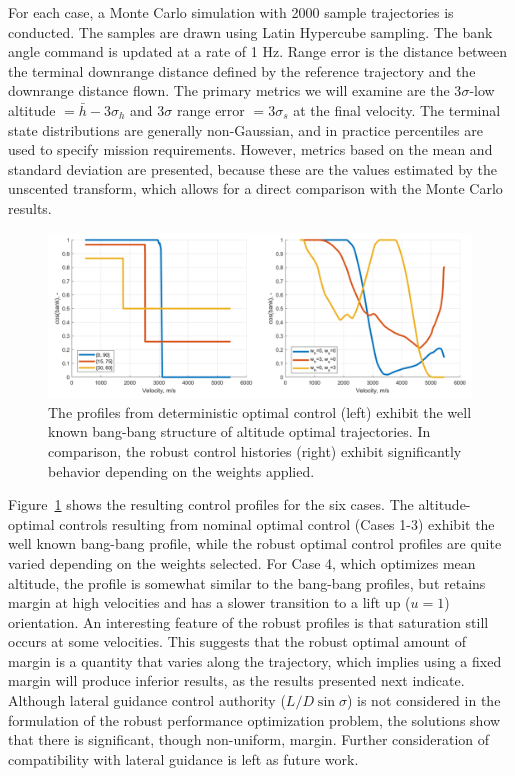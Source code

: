 \documentclass[journal ]{new-aiaa}
\begin{document}
For each case, a Monte Carlo simulation with 2000 sample trajectories is conducted. The samples are drawn using Latin Hypercube sampling. The bank angle command is updated at a rate of 1 Hz. Range error is the distance between the terminal downrange distance defined by the reference trajectory and the downrange distance flown. The primary metrics we will examine are the 3$\sigma$-low altitude $=\bar{h}-3\sigma_h$ and 3$\sigma$ range error $= 3\sigma_s$ at the final velocity. The terminal state distributions are generally non-Gaussian, and in practice percentiles are used to specify mission requirements. However, metrics based on the mean and standard deviation are presented, because these are the values estimated by the unscented transform, which allows for a direct comparison with the Monte Carlo results.
\begin{figure}[h!]
	\centering
	\includegraphics[width=1\textwidth]{ddp/comparison_controls}
	\caption{The profiles from deterministic optimal control (left) exhibit the well known bang-bang structure of altitude optimal trajectories. In comparison, the robust control histories (right) exhibit significantly behavior depending on the weights applied.}
	\label{fig_control_comparison}
\end{figure}

Figure~\ref{fig_control_comparison} shows the resulting control profiles for the six cases. The altitude-optimal controls resulting from nominal optimal control (Cases 1-3) exhibit the well known bang-bang profile, while the robust optimal control profiles are quite varied depending on the weights selected. For Case 4, which optimizes mean altitude, the profile is somewhat similar to the bang-bang profiles, but retains margin at high velocities and has a slower transition to a lift up ($u=1$) orientation. An interesting feature of the robust profiles is that saturation still occurs at some velocities. This suggests that the robust optimal amount of margin is a quantity that varies along the trajectory, which implies using a fixed margin will produce inferior results, as the results presented next indicate. Although lateral guidance control authority ($L/D \sin\sigma$) is not considered in the formulation of the robust performance optimization problem, the solutions show that there is significant, though non-uniform, margin. Further consideration of compatibility with lateral guidance is left as future work. %
\end{document}
